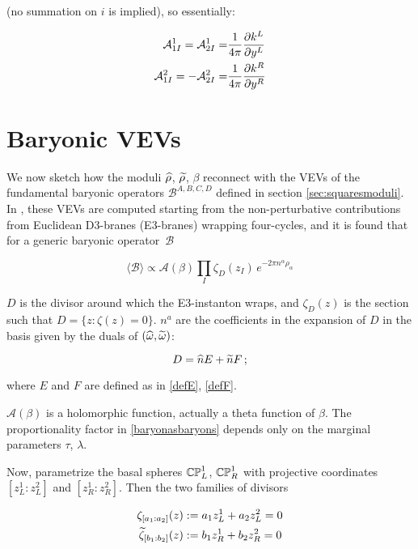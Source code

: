 (no summation on $i$ is implied), so essentially:

\begin{align}
	\mathcal{A}_{1I}^1 = \mathcal{A}_{2I}^1 = & \frac{1}{4\pi} \frac{\partial k^L}{\partial y^L} \\
	\mathcal{A}_{1I}^2 = - \mathcal{A}_{2I}^2 = & \frac{1}{4\pi} \frac{\partial k^R}{\partial y^R} 
	\label{}
\end{align}



\section{Baryonic VEVs}

We now sketch how the moduli $\widehat{\rho}$, $\widetilde{\rho}$, $\beta$ reconnect with the VEVs of the fundamental baryonic operators $\mathcal{B}^{A,B,C,D}$ defined in section \ref{sec:squaresmoduli}. In \cite{MZ}, these VEVs are computed starting from the non-perturbative contributions from Euclidean D3-branes (E3-branes) wrapping four-cycles, and it is found that for a generic baryonic o\-pe\-ra\-tor~$\mathcal{B}$

\begin{equation}
	\langle \mathcal{B} \rangle \propto \mathcal{A}(\beta) \prod_I \zeta_D(z_I) \, e^{-2\pi n^\alpha \rho_\alpha}
	\label{baryonasbaryons}
\end{equation}

$D$ is the divisor around which the E3-instanton wraps, and $\zeta_D(z)$ is the section such that $D = \{z :  \zeta(z) = 0\}$. $n^a$ are the coefficients in the expansion of $D$ in the basis given by the duals of $(\widehat{\omega},\widetilde{\omega})$:

\begin{equation}
	D = \widehat{n} E + \widetilde{n} F\,;
	\label{}
\end{equation}

where $E$ and $F$ are defined as in \eqref{defE}, \eqref{defF}.

$\mathcal{A}(\beta)$ is a holomorphic function, actually a theta function of $\beta$. The proportionality factor in \eqref{baryonasbaryons} depends only on the marginal parameters $\tau$, $\lambda$.

Now, parametrize the basal spheres $\mathbb{CP}^1_L$, $\mathbb{CP}^1_R$ with projective coordinates $[z_L^1 : z_L^2]$ and $[z_R^1 : z_R^2]$. Then the two families of divisors

\begin{align}
	\zeta_{[a_1:a_2]} (z) &:= a_1 z_L^1 + a_2 z_L^2 = 0\\
	\widetilde{\zeta}_{[b_1:b_2]} (z) &:= b_1 z_R^1 + b_2 z_R^2 = 0
	\label{}
\end{align}

